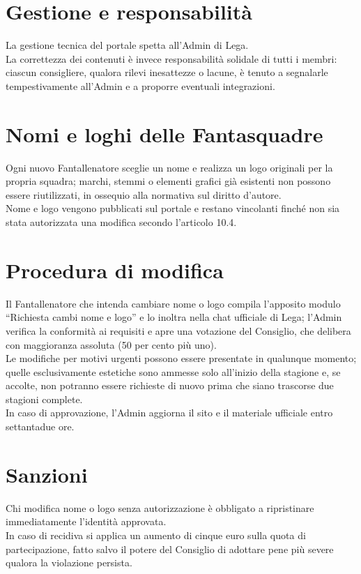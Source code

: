 \section{Gestione e responsabilità}
\label{art:10.2}

La gestione tecnica del portale spetta all’Admin di Lega.\\
La correttezza dei contenuti è invece responsabilità solidale di tutti i membri: ciascun consigliere, qualora rilevi inesattezze o lacune, è tenuto a segnalarle tempestivamente all’Admin e a proporre eventuali integrazioni.

\section{Nomi e loghi delle Fantasquadre}
\label{art:10.3}

Ogni nuovo Fantallenatore sceglie un nome e realizza un logo originali per la propria squadra; marchi, stemmi o elementi grafici già esistenti non possono essere riutilizzati, in ossequio alla normativa sul diritto d’autore.\\
Nome e logo vengono pubblicati sul portale e restano vincolanti finché non sia stata autorizzata una modifica secondo l’articolo 10.4.

\section{Procedura di modifica}
\label{art:10.4}

Il Fantallenatore che intenda cambiare nome o logo compila l’apposito modulo “Richiesta cambi nome e logo” e lo inoltra nella chat ufficiale di Lega; l’Admin verifica la conformità ai requisiti e apre una votazione del Consiglio, che delibera con maggioranza assoluta (50 per cento più uno).\\
Le modifiche per motivi urgenti possono essere presentate in qualunque momento; quelle esclusivamente estetiche sono ammesse solo all’inizio della stagione e, se accolte, non potranno essere richieste di nuovo prima che siano trascorse due stagioni complete.\\
In caso di approvazione, l’Admin aggiorna il sito e il materiale ufficiale entro settantadue ore.

\section{Sanzioni}
\label{art:10.5}

Chi modifica nome o logo senza autorizzazione è obbligato a ripristinare immediatamente l’identità approvata.\\
In caso di recidiva si applica un aumento di cinque euro sulla quota di partecipazione, fatto salvo il potere del Consiglio di adottare pene più severe qualora la violazione persista.

